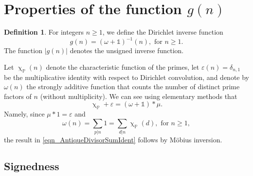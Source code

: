 \documentclass[11pt,reqno,a4letter]{article}
\numberwithin{equation}{section}
\numberwithin{figure}{section}
\numberwithin{table}{section}
\renewcommand{\chi}{\upchi}
\theoremstyle{plain}
\numberwithin{theorem}{section}
\theoremstyle{definition}
\newtheorem{definition}[theorem]{Definition}
\begin{document}
\section{Properties of the function $g(n)$} 
\label{Section_NewFormulasForgInvn_v2} 

\begin{definition}
For integers $n \geq 1$, we define the Dirichlet inverse function 
\[
g(n) = (\omega + \mathds{1})^{-1}(n), \text{ for } n \geq 1. 
\]
The function $|g(n)|$ denotes the unsigned inverse function. 
\end{definition}

Let $\chi_{\mathbb{P}}(n)$ denote the characteristic function of the primes, let 
$\varepsilon(n) = \delta_{n,1}$ be the multiplicative identity with respect to Dirichlet convolution, 
and denote by $\omega(n)$ the strongly additive function that counts the number of 
distinct prime factors of $n$ (without multiplicity). 
We can see using elementary methods that 
\begin{equation}
\label{eqn_AntiqueDivisorSumIdent} 
\chi_{\mathbb{P}} + \varepsilon = (\omega + \mathds{1}) \ast \mu. 
\end{equation} 
Namely, since $\mu \ast 1 = \varepsilon$ and 
\[
\omega(n) = \sum_{p|n} 1 = \sum_{d|n} \chi_{\mathbb{P}}(d), \text{ for } n \geq 1, 
\]
the result in \eqref{eqn_AntiqueDivisorSumIdent} follows by M\"obius inversion.

\subsection{Signedness}
\label{Section_PrelimProofs_Config} 
\label{subSection_ProofOfSignednessOfgInvn_v1} 
\end{document}

